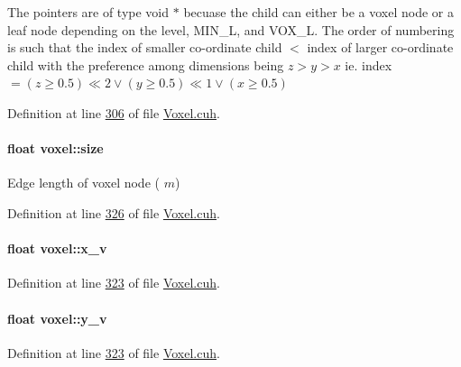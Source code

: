 The pointers are of type void $\ast$ becuase the child can either be a voxel node or a leaf node depending on the level, M\+I\+N\+\_\+L, and V\+O\+X\+\_\+L. The order of numbering is such that the index of smaller co-\/ordinate child $<$ index of larger co-\/ordinate child with the preference among dimensions being $ z > y > x$ ie. index $ = (z\geq0.5)\ll2 \lor (y\geq0.5)\ll1 \lor (x\geq0.5)$ 

Definition at line \hyperlink{Voxel_8cuh_source_l00306}{306} of file \hyperlink{Voxel_8cuh_source}{Voxel.\+cuh}.

\paragraph[{\texorpdfstring{size}{size}}]{\setlength{\rightskip}{0pt plus 5cm}float voxel\+::size}\hypertarget{classvoxel_a573bae3d6e8383a4b2235d3cd33e7ab6}{}\label{classvoxel_a573bae3d6e8383a4b2235d3cd33e7ab6}
Edge length of voxel node ( $\textit{m}$) 

Definition at line \hyperlink{Voxel_8cuh_source_l00326}{326} of file \hyperlink{Voxel_8cuh_source}{Voxel.\+cuh}.

\paragraph[{\texorpdfstring{x\+\_\+v}{x_v}}]{\setlength{\rightskip}{0pt plus 5cm}float voxel\+::x\+\_\+v}\hypertarget{classvoxel_a263a7912d9018052399d4b99fb220f2e}{}\label{classvoxel_a263a7912d9018052399d4b99fb220f2e}


Definition at line \hyperlink{Voxel_8cuh_source_l00323}{323} of file \hyperlink{Voxel_8cuh_source}{Voxel.\+cuh}.

\paragraph[{\texorpdfstring{y\+\_\+v}{y_v}}]{\setlength{\rightskip}{0pt plus 5cm}float voxel\+::y\+\_\+v}\hypertarget{classvoxel_a67b339eef4ce4330a18d15973dcf6a24}{}\label{classvoxel_a67b339eef4ce4330a18d15973dcf6a24}


Definition at line \hyperlink{Voxel_8cuh_source_l00323}{323} of file \hyperlink{Voxel_8cuh_source}{Voxel.\+cuh}.

